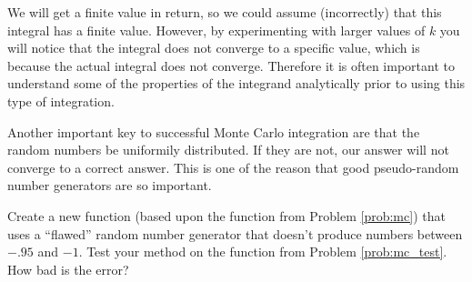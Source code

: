 We will get a finite value in return, so we could assume (incorrectly) that this integral has a finite value. However, by experimenting with larger values of $k$ you will notice that the integral does not converge to a specific value, which is because the actual integral does not converge. Therefore it is often important to understand some of the properties of the integrand analytically prior to using this type of integration.

Another important key to successful Monte Carlo integration are that the random numbers be uniformily distributed. If they are not, our answer will not converge to a correct answer. This is one of the reason that good pseudo-random number generators are so important.

\begin{problem}
\label{prob:mc_flawed}
Create a new function (based upon the function from Problem \ref{prob:mc}) that uses a ``flawed'' random number generator that doesn't produce numbers between $-.95$ and $-1$. Test your method on the function from Problem \ref{prob:mc_test}. How bad is the error? 
\end{problem}




